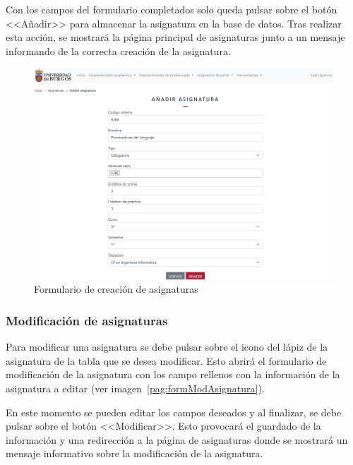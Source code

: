 Con los campos del formulario completados solo queda pulsar sobre el botón <<Añadir>> para almacenar la asignatura en la base de datos.
Tras realizar esta acción, se mostrará la página principal de asignaturas junto a un mensaje informando de la correcta creación de la asignatura.

\begin{figure}
	\centering
	\includegraphics[width=\textwidth]{../img/Anexos/Manual usuario/formAsignatura.png}
	\caption{Formulario de creación de asignaturas}\label{pag:formAsignatura}
\end{figure}

\subsubsection{Modificación de asignaturas}
Para modificar una asignatura se debe pulsar sobre el icono del lápiz de la asignatura de la tabla que se desea modificar.
Esto abrirá el formulario de modificación de la asignatura con los campo rellenos con la información de la asignatura a editar (ver imagen~\ref{pag:formModAsignatura}).

En este momento se pueden editar los campos deseados y al finalizar, se debe pulsar sobre el botón <<Modificar>>.
Esto provocará el guardado de la información y una redirección a la página de asignaturas donde se mostrará un mensaje informativo sobre la modificación de la asignatura.


